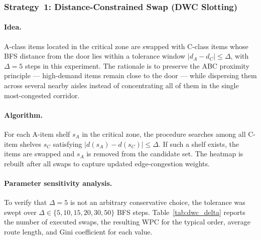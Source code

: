 \documentclass[12pt,a4paper]{article}
\begin{document}
\subsubsection{Strategy~1: Distance-Constrained Swap (DWC Slotting)}

\paragraph{Idea.}
A-class items located in the critical zone are swapped with C-class items
whose BFS distance from the door lies within a tolerance window
$|d_A - d_C| \le \Delta$, with $\Delta = 5$ steps in this experiment.
The rationale is to preserve the ABC proximity principle --- high-demand items remain
close to the door --- while dispersing them across several nearby aisles instead of
concentrating all of them in the single most-congested corridor.

\paragraph{Algorithm.}
For each A-item shelf $s_A$ in the critical zone, the procedure searches among all
C-item shelves $s_C$ satisfying $|d(s_A) - d(s_C)| \le \Delta$.
If such a shelf exists, the items are swapped and $s_A$ is removed from the
candidate set.
The heatmap is rebuilt after all swaps to capture updated edge-congestion weights.

\paragraph{Parameter sensitivity analysis.}
To verify that $\Delta = 5$ is not an arbitrary conservative choice, the tolerance
was swept over $\Delta \in \{5, 10, 15, 20, 30, 50\}$ BFS steps.
Table~\ref{tab:dwc_delta} reports the number of executed swaps, the resulting WPC
for the typical order, average route length, and Gini coefficient for each value.
\end{document}
